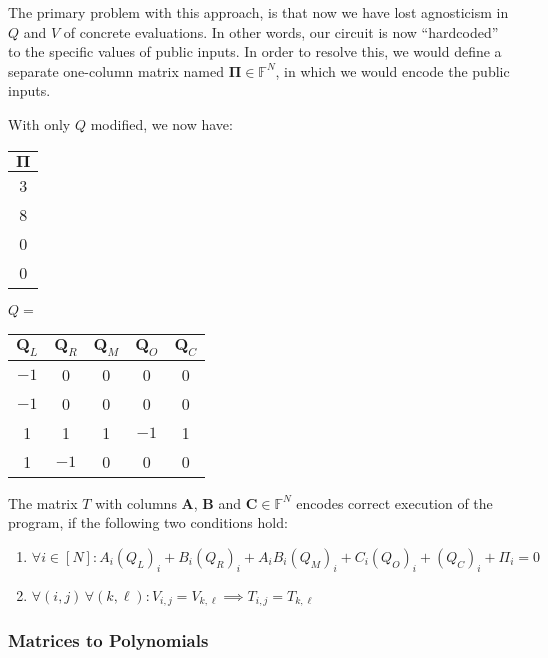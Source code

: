 \documentclass[../lecture-notes-148x210.tex]{subfiles}
\begin{document}
The primary problem with this approach, is that now we have lost agnosticism in
$Q$ and $V$ of concrete evaluations. In other words, our circuit is now
``hardcoded'' to the specific values of public inputs. In order to resolve this,
we would define a separate one-column matrix named $\boldsymbol{\Pi} \in \mathbb{F}^N$, in which
we would encode the public inputs.

\begin{example}
With only $Q$ modified, we now have:

\centering 
\begin{center}
\begin{tabular}{|c|}
\hline
\rowcolor{gray!30} $\boldsymbol{\Pi}$ \\ 
\hline
3 \\ 
\hline
8 \\ 
\hline
0 \\ 
\hline
0 \\ 
\hline
\end{tabular} \hspace{1cm}
$Q=$ 
\begin{tabular}{|c|c|c|c|c|}
\hline
\rowcolor{gray!30} $\mathbf{Q}_L$ & $\mathbf{Q}_R$ & $\mathbf{Q}_M$ & $\mathbf{Q}_O$ & $\mathbf{Q}_C$ \\ 
\hline
$-1$ & 0 & 0 & 0 & 0 \\ 
\hline
$-1$ & 0 & 0 & 0 & 0 \\ 
\hline
1 & 1 & 1 & $-1$ & 1 \\ 
\hline
1 & $-1$ & 0 & 0 & 0 \\ 
\hline
\end{tabular}
\end{center}
\end{example}

\begin{proposition}[Wrap-up]\label{prop:plonk-conditions}
The matrix $T$ with columns $\mathbf{A}$, $\mathbf{B}$ and $\mathbf{C} \in \mathbb{F}^N$ encodes correct execution of the program, if the following two conditions hold:
\begin{enumerate}
    \item \(\forall i \in [N]: A_i (Q_{L})_i + B_i(Q_{R})_i + A_i B_i (Q_{M})_i + C_i (Q_{O})_i + (Q_{C})_i + \Pi_i = 0\)
    \item \(\forall (i, j) \, \forall (k, \ell): V_{i,j} = V_{k,\ell} \implies T_{i,j} = T_{k,\ell}\)
\end{enumerate}
\end{proposition}

\subsubsection{Matrices to Polynomials}
\end{document}
